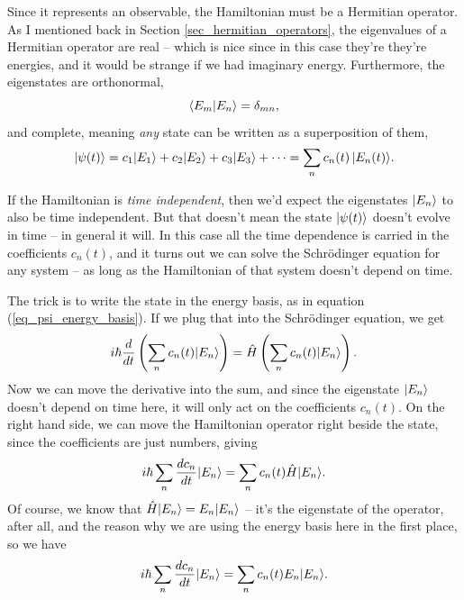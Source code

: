 Since it represents an observable, the Hamiltonian must be a Hermitian operator.  As I mentioned back in Section \ref{sec_hermitian_operators}, the eigenvalues of a Hermitian operator are real -- which is nice since in this case they're they're energies, and it would be strange if we had imaginary energy. Furthermore, the eigenstates are orthonormal,
\begin{equation}
\langle E_m | E_n \rangle = \delta_{mn},
\end{equation}
and complete, meaning \emph{any} state can be written as a superposition of them,
\begin{equation}
\label{eq_psi_energy_basis}
| \psi(t) \rangle = c_1 | E_1 \rangle + c_2 | E_2 \rangle + c_3 | E_3 \rangle + \cdots = \sum_n c_n (t) \, | E_n(t) \rangle.
\end{equation}

If the Hamiltonian is \emph{time independent}, then we'd expect the eigenstates $| E_n \rangle$ to also be time independent.  But that doesn't mean the state $| \psi(t) \rangle$ doesn't evolve in time -- in general it will.  In this case all the time dependence is carried in the coefficients $c_n(t)$, and it turns out we can solve the Schr\"odinger equation for any system -- as long as the Hamiltonian of that system doesn't depend on time.

The trick is to write the state in the energy basis, as in equation (\ref{eq_psi_energy_basis}).  If we plug that into the Schr\"odinger equation, we get
\[
i\hbar \frac{d}{dt} \left( \sum_n c_n(t) | E_n \rangle \right) = \hat{H} \left(\sum_n c_n(t) | E_n \rangle \right).
\]
Now we can move the derivative into the sum, and since the eigenstate $| E_n \rangle$ doesn't depend on time here, it will only act on the coefficients $c_n(t)$.  On the right hand side, we can move the Hamiltonian operator right beside the state, since the coefficients are just numbers, giving
\[
i\hbar \sum_n \frac{dc_n}{dt} | E_n \rangle = \sum_n c_n(t) \hat{H} | E_n \rangle.
\]
Of course, we know that $\hat{H} | E_n \rangle = E_n | E_n \rangle$ -- it's the eigenstate of the operator, after all, and the reason why we are using the energy basis here in the first place, so we have
\[
i\hbar \sum_n \frac{dc_n}{dt} | E_n \rangle = \sum_n c_n(t) E_n | E_n \rangle.
\]

